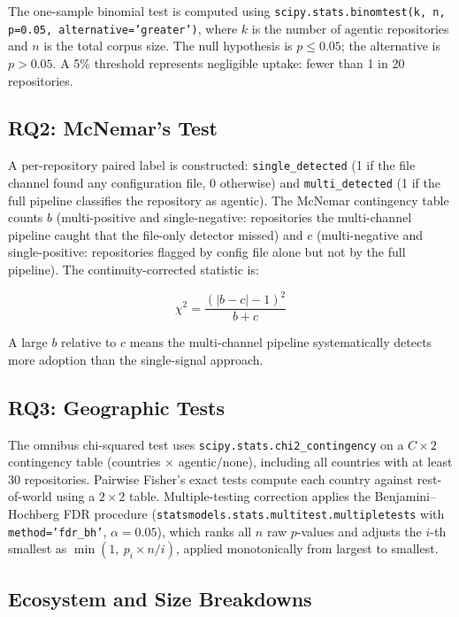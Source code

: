 The one-sample binomial test is computed using \texttt{scipy.stats.binomtest(k, n, p=0.05, alternative='greater')}, where $k$ is the number of agentic repositories and $n$ is the total corpus size. The null hypothesis is $p \leq 0.05$; the alternative is $p > 0.05$. A 5\% threshold represents negligible uptake: fewer than 1 in 20 repositories.

\subsection{RQ2: McNemar's Test}

A per-repository paired label is constructed: \texttt{single\_detected} (1 if the file channel found any configuration file, 0 otherwise) and \texttt{multi\_detected} (1 if the full pipeline classifies the repository as agentic). The McNemar contingency table counts $b$ (multi-positive and single-negative: repositories the multi-channel pipeline caught that the file-only detector missed) and $c$ (multi-negative and single-positive: repositories flagged by config file alone but not by the full pipeline). The continuity-corrected statistic is:

\[
\chi^2 = \frac{(|b - c| - 1)^2}{b + c}
\]

A large $b$ relative to $c$ means the multi-channel pipeline systematically detects more adoption than the single-signal approach.

\subsection{RQ3: Geographic Tests}

The omnibus chi-squared test uses \texttt{scipy.stats.chi2\_contingency} on a $C \times 2$ contingency table (countries $\times$ agentic/none), including all countries with at least 30 repositories. Pairwise Fisher's exact tests compute each country against rest-of-world using a $2 \times 2$ table. Multiple-testing correction applies the Benjamini--Hochberg FDR procedure (\texttt{statsmodels.stats.multitest.multipletests} with \texttt{method='fdr\_bh'}, $\alpha = 0.05$), which ranks all $n$ raw $p$-values and adjusts the $i$-th smallest as $\min(1,\ p_i \times n / i)$, applied monotonically from largest to smallest.

\subsection{Ecosystem and Size Breakdowns}

